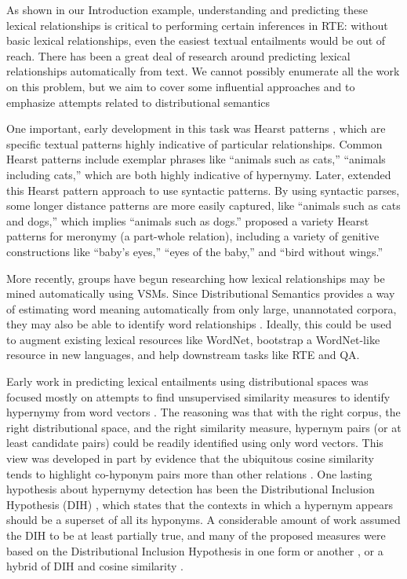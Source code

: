 As shown in our Introduction example, understanding and predicting these
lexical relationships is critical to performing certain inferences in RTE:
without basic lexical relationships, even the easiest textual entailments would
be out of reach. There has been a great deal of research around predicting
lexical relationships automatically from text. We cannot possibly enumerate all
the work on this problem, but we aim to cover some influential approaches and
to emphasize attempts related to distributional semantics

One important, early development in this task was Hearst patterns
\cite{hearst:1992:coling}, which are specific textual patterns highly
indicative of particular relationships. Common Hearst patterns include
exemplar phrases like ``animals such as cats,'' ``animals including cats,'' which are both highly
indicative of hypernymy. Later,
 extended this Hearst pattern approach
to use syntactic patterns. By using syntactic parses, some longer distance patterns
are more easily captured, like ``animals such as cats and dogs,'' which implies
``animals such as dogs.''
 proposed a variety Hearst patterns for meronymy (a
part-whole relation), including a variety of genitive constructions like
``baby's eyes,'' ``eyes of the baby,'' and ``bird without wings.''

More recently, groups have begun researching how lexical relationships may be
mined automatically using VSMs. Since Distributional
Semantics provides a way of estimating word meaning automatically from only
large, unannotated corpora, they may also be able to identify
word relationships \cite{baroni:2011:gems,baroni:2012:eacl}. Ideally, this
could be used to augment existing lexical resources like WordNet, bootstrap
a WordNet-like resource in new languages, and help downstream tasks like RTE
and QA.

Early work in predicting lexical entailments using distributional spaces was
focused mostly on attempts to find unsupervised similarity measures to identify
hypernymy from word vectors
\cite{weeds:2004:coling,clarke:2009:gems,kotlerman:2010:nle,lenci:2012:starsem,santus:2013:thesis}.
The reasoning was that with the right corpus, the right
distributional space, and the right similarity measure, hypernym pairs
(or at least candidate pairs) could be readily identified using only word
vectors. This view was developed in part by evidence that the ubiquitous
cosine similarity tends to highlight co-hyponym pairs more than other relations
\cite{weeds:2004:coling,baroni:2011:gems}.  One lasting hypothesis about
hypernymy detection has been the Distributional Inclusion Hypothesis (DIH)
\cite{zhitomirskygeffet:2005:acl}, which states that the contexts in which a
hypernym appears should be a superset of all its hyponyms. A considerable
amount of work assumed the DIH to be at least partially true, and many of the
proposed measures were based on the Distributional Inclusion Hypothesis in one
form or another \cite{clarke:2009:gems}, or a hybrid of DIH and cosine
similarity \cite{kotlerman:2010:nle,lenci:2012:starsem}.

